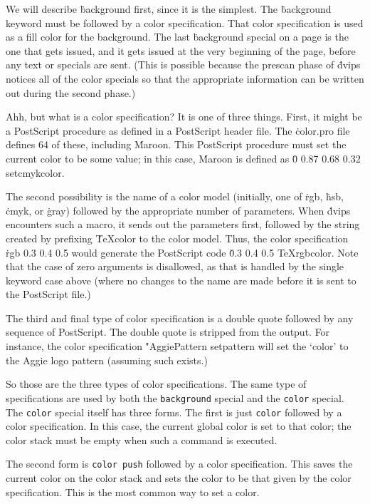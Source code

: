 We will describe \.{background} first, since it is the simplest.
The \.{background} keyword must be followed by a color specification.
That color specification is used as a fill color for the background.
The last \.{background} special on a page is the one that gets issued,
and it gets issued at the very beginning of the page, before any
text or specials are sent.  (This is possible because the prescan
phase of \.{dvips} notices all of the color specials so that the
appropriate information can be written out during the second phase.)

Ahh, but what is a color specification?  It is one of three things.
First, it might be a PostScript procedure as defined in a PostScript header
file.  The \.{color.pro} file defines 64 of these, including
\.{Maroon}.  This PostScript procedure must set the current color to be
some value; in this case, \.{Maroon} is defined as
\.{0 0.87 0.68 0.32 setcmykcolor}.

The second possibility is the name of a color model (initially, one of
\.{rgb}, \.{hsb}, \.{cmyk}, or \.{gray}) followed by the appropriate
number of parameters.  When \.{dvips} encounters such a macro, it sends
out the parameters first, followed by the string created by prefixing
\.{TeXcolor} to the color model.  Thus, the color specification
\.{rgb 0.3 0.4 0.5} would generate the PostScript code \.{0.3 0.4 0.5
TeXrgbcolor}.  Note that the case of zero arguments is disallowed, as
that is handled by the single keyword case above (where no changes to
the name are made before it is sent to the PostScript file.)

The third and final type of color specification is a double quote followed
by any sequence of PostScript.  The double quote is stripped from the
output.  For instance, the color specification \.{"AggiePattern setpattern}
will set the `color' to the Aggie logo pattern (assuming such exists.)

So those are the three types of color specifications.  The same type of
specifications are used by both the {\tt background} special and the
{\tt color} special.  The {\tt color} special itself has three forms.
The first is just {\tt color} followed by a color specification.  In
this case, the current global color is set to that color; the color stack
must be empty when such a command is executed.

The second form is {\tt color push} followed by a color specification.
This saves the current color on the color stack and sets the color
to be that given by the color specification.  This is the most common
way to set a color.

